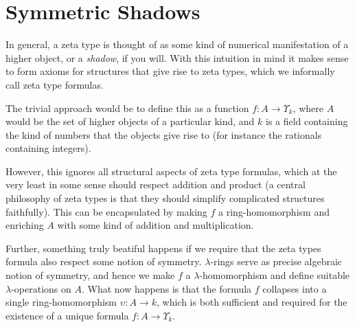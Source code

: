 \section{Symmetric Shadows}

In general, a zeta type is thought of as some kind of numerical manifestation of a higher object, or a \emph{shadow}, if you will. With this intuition in mind it makes sense to form axioms for structures that give rise to zeta types, which we informally call zeta type formulas.
 
 The trivial approach would be to define this as a function $f : A \to \Upsilon_k$, where $A$ would be the set of higher objects of a particular kind, and $k$ is a field containing the kind of numbers that the objects give rise to (for instance the rationals containing integers). 
 
 However, this ignores all structural aspects of zeta type formulas, which at the very least in some sense should respect addition and product (a central philosophy of zeta types is that they should simplify complicated structures faithfully). This can be encapsulated by making $f$ a ring-homomorphism and enriching $A$ with some kind of addition and multiplication. 
 
 Further, something truly beatiful happens if we require that the zeta types formula also respect some notion of symmetry. $\lambda$-rings serve as precise algebraic notion of symmetry, and hence we make $f$ a $\lambda$-homomorphism and define suitable $\lambda$-operations on $A$. What now happens is that the formula $f$ collapses into a single ring-homomorphism $\upsilon : A \to k$, which is both sufficient and required for the existence of a unique formula $f : A \to \Upsilon_k$.

